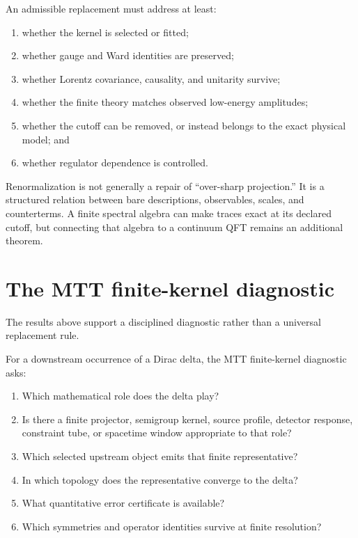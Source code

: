 \documentclass[11pt]{article}
\begin{document}
An admissible replacement must address at least:
\begin{enumerate}
\item whether the kernel is selected or fitted;
\item whether gauge and Ward identities are preserved;
\item whether Lorentz covariance, causality, and unitarity survive;
\item whether the finite theory matches observed low-energy amplitudes;
\item whether the cutoff can be removed, or instead belongs to the exact
physical model; and
\item whether regulator dependence is controlled.
\end{enumerate}

Renormalization is not generally a repair of ``over-sharp projection.'' It is
a structured relation between bare descriptions, observables, scales, and
counterterms. A finite spectral algebra can make traces exact at its declared
cutoff, but connecting that algebra to a continuum QFT remains an additional
theorem.

\section{The MTT finite-kernel diagnostic}

The results above support a disciplined diagnostic rather than a universal
replacement rule.

\begin{definition}
For a downstream occurrence of a Dirac delta, the MTT finite-kernel diagnostic
asks:
\begin{enumerate}
\item Which mathematical role does the delta play?
\item Is there a finite projector, semigroup kernel, source profile, detector
response, constraint tube, or spacetime window appropriate to that role?
\item Which selected upstream object emits that finite representative?
\item In which topology does the representative converge to the delta?
\item What quantitative error certificate is available?
\item Which symmetries and operator identities survive at finite resolution?
\end{enumerate}
\end{definition}
\end{document}
